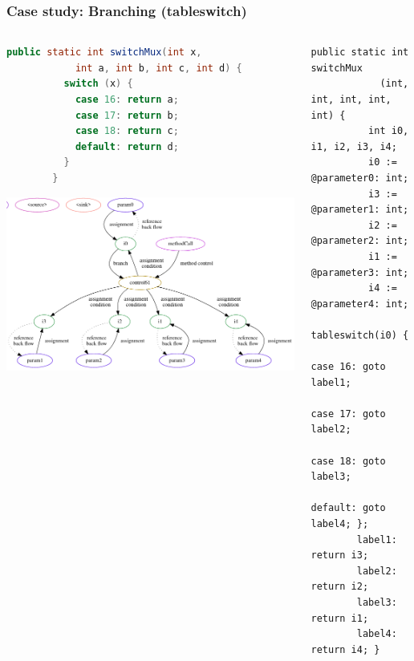 \documentclass{beamer}
\begin{document}
\begin{frame}[fragile, t]
  \frametitle{Case study: Branching (tableswitch)}
  \begin{columns}[t]
    \begin{column}{0.5\textwidth}
      \begin{lstlisting}[style=j, language=java, gobble=6, tabsize=2, basicstyle=\ttfamily\tiny]
        public static int switchMux(int x,
            int a, int b, int c, int d) {
          switch (x) {
            case 16: return a;
            case 17: return b;
            case 18: return c;
            default: return d;
          }
        }
      \end{lstlisting}
      \includegraphics[scale=0.28]{screenshot20201217125744.png}
    \end{column}
    \begin{column}{0.5\textwidth}
      \begin{lstlisting}[style=j, gobble=6, tabsize=2, basicstyle=\ttfamily\tiny, numbers=none]
        public static int switchMux
            (int, int, int, int, int) {
          int i0, i1, i2, i3, i4;
          i0 := @parameter0: int;
          i3 := @parameter1: int;
          i2 := @parameter2: int;
          i1 := @parameter3: int;
          i4 := @parameter4: int;
          tableswitch(i0) {
              case 16: goto label1;
              case 17: goto label2;
              case 18: goto label3;
              default: goto label4; };
        label1: return i3;
        label2: return i2;
        label3: return i1;
        label4: return i4; }
      \end{lstlisting}
    \end{column}
  \end{columns}
\end{frame}
\end{document}
